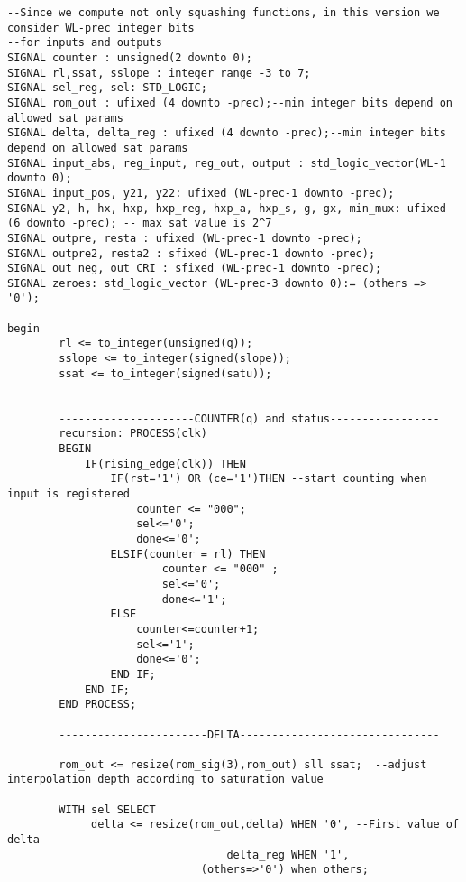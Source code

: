 \begin{code}
\begin{verbatim}
--Since we compute not only squashing functions, in this version we consider WL-prec integer bits
--for inputs and outputs
SIGNAL counter : unsigned(2 downto 0);
SIGNAL rl,ssat, sslope : integer range -3 to 7;
SIGNAL sel_reg, sel: STD_LOGIC;
SIGNAL rom_out : ufixed (4 downto -prec);--min integer bits depend on allowed sat params
SIGNAL delta, delta_reg : ufixed (4 downto -prec);--min integer bits depend on allowed sat params
SIGNAL input_abs, reg_input, reg_out, output : std_logic_vector(WL-1 downto 0);
SIGNAL input_pos, y21, y22: ufixed (WL-prec-1 downto -prec);
SIGNAL y2, h, hx, hxp, hxp_reg, hxp_a, hxp_s, g, gx, min_mux: ufixed (6 downto -prec); -- max sat value is 2^7
SIGNAL outpre, resta : ufixed (WL-prec-1 downto -prec);
SIGNAL outpre2, resta2 : sfixed (WL-prec-1 downto -prec);
SIGNAL out_neg, out_CRI : sfixed (WL-prec-1 downto -prec);
SIGNAL zeroes: std_logic_vector (WL-prec-3 downto 0):= (others => '0');
 
begin
        rl <= to_integer(unsigned(q));
        sslope <= to_integer(signed(slope));
        ssat <= to_integer(signed(satu));
    
        -----------------------------------------------------------
        ---------------------COUNTER(q) and status-----------------	
        recursion: PROCESS(clk)
        BEGIN
            IF(rising_edge(clk)) THEN
                IF(rst='1') OR (ce='1')THEN --start counting when input is registered
                    counter <= "000";
                    sel<='0';
                    done<='0';
                ELSIF(counter = rl) THEN
                        counter <= "000" ;
                        sel<='0';
                        done<='1';
                ELSE
                    counter<=counter+1;
                    sel<='1';
                    done<='0';
                END IF;
            END IF;
        END PROCESS;
        -----------------------------------------------------------
        -----------------------DELTA-------------------------------	
     
        rom_out <= resize(rom_sig(3),rom_out) sll ssat;  --adjust interpolation depth according to saturation value
        
        WITH sel SELECT
             delta <= resize(rom_out,delta) WHEN '0', --First value of delta
                                  delta_reg WHEN '1', 
                              (others=>'0') when others;
        

\end{verbatim}
\end{code}
